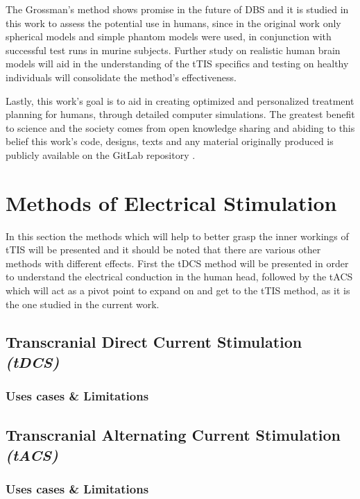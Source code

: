 The Grossman's method shows promise in the future of \gls{DBS} and it is studied in this work to assess the potential use in humans, since in the original work \cite{Grossman2017} only spherical models and simple phantom models were used, in conjunction with successful test runs in murine subjects. Further study on realistic human brain models will aid in the understanding of the \gls{tTIS} specifics and testing on healthy individuals will consolidate the method's effectiveness.

Lastly, this work's goal is to aid in creating optimized and personalized treatment planning for humans, through detailed computer simulations. The greatest benefit to science and the society comes from open knowledge sharing and abiding to this belief this work's code, designs, texts and any material originally produced is publicly available on the GitLab repository \cite{thesis_repo}.

\section{Methods of Electrical Stimulation}

In this section the methods which will help to better grasp the inner workings of \gls{tTIS} will be presented and it should be noted that there are various other methods with different effects. First the \gls{tDCS} method will be presented in order to understand the electrical conduction in the human head, followed by the \gls{tACS} which will act as a pivot point to expand on and get to the \gls{tTIS} method, as it is the one studied in the current work. 

\subsection{Transcranial Direct Current Stimulation \textit{(tDCS)}}
\cite{Nitsche2008}
\subsubsection{Uses cases \& Limitations}

\subsection{Transcranial Alternating Current Stimulation \textit{(tACS)}}
\subsubsection{Uses cases \& Limitations}

